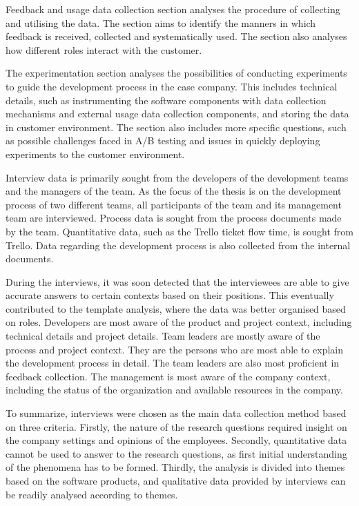\documentclass[english, grading]{tktltiki2}
\theoremstyle{definition}
\theoremstyle{remark}
\begin{document}
Feedback and usage data collection section analyses the procedure of collecting and utilising the data. The section aims to identify the manners in which feedback is received, collected and systematically used. The section also analyses how different roles interact with the customer. 

The experimentation section analyses the possibilities of conducting experiments to guide the development process in the case company. This includes technical details, such as instrumenting the software components with data collection mechanisms and external usage data collection components, and storing the data in customer environment. The section also includes more specific questions, such as possible challenges faced in A/B testing and issues in quickly deploying experiments to the customer environment.  

Interview data is primarily sought from the developers of the development teams and the managers of the team. As the focus of the thesis is on the development process of two different teams, all participants of the team and its management team are interviewed. Process data is sought from the process documents made by the team. Quantitative data, such as the Trello ticket flow time, is sought from Trello. Data regarding the development process is also collected from the internal documents.

During the interviews, it was soon detected that the interviewees are able to give accurate answers to certain contexts based on their positions. This eventually contributed to the template analysis, where the data was better organised based on roles. Developers are most aware of the product and project context, including technical details and project details. Team leaders are mostly aware of the process and project context. They are the persons who are most able to explain the development process in detail. The team leaders are also most proficient in feedback collection. The management is most aware of the company context, including the status of the organization and available resources in the company. 

To summarize, interviews were chosen as the main data collection method based on three criteria. Firstly, the nature of the research questions required insight on the company settings and opinions of the employees. Secondly, quantitative data cannot be used to answer to the research questions, as first initial understanding of the phenomena has to be formed. Thirdly, the analysis is divided into themes based on the software products, and qualitative data provided by interviews can be readily analysed according to themes.
\end{document}
